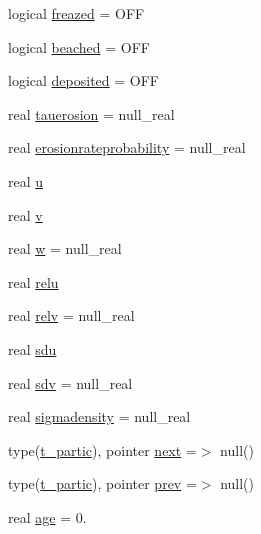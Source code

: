 \begin{DoxyCompactItemize}
logical \mbox{\hyperlink{structmodulelagrangian_1_1t__partic_af841e64bc90931c2fd0f405322be0c22}{freazed}} = O\+FF
\item 
logical \mbox{\hyperlink{structmodulelagrangian_1_1t__partic_a3dc4aef7d4d8b8fb0d0c395841d89ba3}{beached}} = O\+FF
\item 
logical \mbox{\hyperlink{structmodulelagrangian_1_1t__partic_a6893ffd6f46dc0f4f9898032a0d2b42f}{deposited}} = O\+FF
\item 
real \mbox{\hyperlink{structmodulelagrangian_1_1t__partic_abfec231566f25918ea89a00a5f22617e}{tauerosion}} = null\+\_\+real
\item 
real \mbox{\hyperlink{structmodulelagrangian_1_1t__partic_a6de5282753ccef936f726fcb8943b4c7}{erosionrateprobability}} = null\+\_\+real
\item 
real \mbox{\hyperlink{structmodulelagrangian_1_1t__partic_a2641983206c3f7c9f70c3891ee551e62}{u}}
\item 
real \mbox{\hyperlink{structmodulelagrangian_1_1t__partic_a1c02a7e631987ee49e74660e3ad7ef91}{v}}
\item 
real \mbox{\hyperlink{structmodulelagrangian_1_1t__partic_a74dd2bcbdfdc7ce878e00ad0f09433a4}{w}} = null\+\_\+real
\item 
real \mbox{\hyperlink{structmodulelagrangian_1_1t__partic_a0bf86a4ec85a685e328b1ae80a8b13ba}{relu}}
\item 
real \mbox{\hyperlink{structmodulelagrangian_1_1t__partic_a587c63377a4c6c80df24c55990228ab9}{relv}} = null\+\_\+real
\item 
real \mbox{\hyperlink{structmodulelagrangian_1_1t__partic_a755dbf5d61235756870d3b639af34afb}{sdu}}
\item 
real \mbox{\hyperlink{structmodulelagrangian_1_1t__partic_a619f0293637ad291886a690764ab5815}{sdv}} = null\+\_\+real
\item 
real \mbox{\hyperlink{structmodulelagrangian_1_1t__partic_a7f2795a6a06dbcb74c34a0880207f1c5}{sigmadensity}} = null\+\_\+real
\item 
type(\mbox{\hyperlink{structmodulelagrangian_1_1t__partic}{t\+\_\+partic}}), pointer \mbox{\hyperlink{structmodulelagrangian_1_1t__partic_a72376b82f8e16d8a00e1c0fd62d3fab8}{next}} =$>$ null()
\item 
type(\mbox{\hyperlink{structmodulelagrangian_1_1t__partic}{t\+\_\+partic}}), pointer \mbox{\hyperlink{structmodulelagrangian_1_1t__partic_aab4e2988b32a7a602f863906e8125390}{prev}} =$>$ null()
\item 
real \mbox{\hyperlink{structmodulelagrangian_1_1t__partic_aa89ba754cd22a4b9b4ff112ec5105ccd}{age}} = 0.

\end{DoxyCompactItemize}
